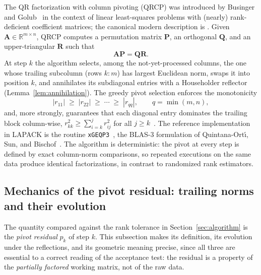 \documentclass[11pt,a4paper]{article}
\theoremstyle{definition}
\newcommand{\R}{\mathbb{R}}
\begin{document}
The QR factorization with column pivoting (QRCP) was introduced by
Businger and Golub~\cite{busingergolub1965} in the context of linear
least-squares problems with (nearly) rank-deficient coefficient
matrices; the canonical modern description is
\cite[\S5.4.2]{golubvanloan2013}. Given $\bm A\in\R^{m\times n}$,
QRCP computes a permutation matrix $\bm P$, an orthogonal $\bm Q$, and
an upper-triangular $\bm R$ such that
\begin{equation}
  \bm A\bm P=\bm Q\bm R.
  \label{eq:qrcp}
\end{equation}
At step $k$ the algorithm selects, among the not-yet-processed
columns, the one whose trailing subcolumn (rows $k{:}m$) has largest
Euclidean norm, swaps it into position $k$, and annihilates its
subdiagonal entries with a Householder reflector
(Lemma~\ref{lem:annihilation}). The greedy pivot selection enforces
the monotonicity
\begin{equation}
  |r_{11}|\;\ge\;|r_{22}|\;\ge\;\cdots\;\ge\;|r_{qq}|,
  \qquad q=\min(m,n),
  \label{eq:monotone}
\end{equation}
and, more strongly, guarantees that each diagonal entry dominates the
trailing block column-wise,
$r_{kk}^{2}\ge\sum_{i=k}^{j}r_{ij}^{2}$ for all $j\ge
k$~\cite[\S5.4.2]{golubvanloan2013}. The reference implementation in
LAPACK is the routine \texttt{xGEQP3}~\cite{lapack1999}, the BLAS-3
formulation of Quintana-Ort\'{\i}, Sun, and
Bischof~\cite{quintanaorti1998}. The algorithm is deterministic: the
pivot at every step is defined by exact column-norm comparisons, so
repeated executions on the same data produce identical factorizations,
in contrast to randomized rank estimators.

\subsection{Mechanics of the pivot residual: trailing norms and their
evolution}
\label{sec:pivotresidual}

The quantity compared against the rank tolerance in
Section~\ref{sec:algorithm} is the \emph{pivot residual}
$p_k$ of step $k$. This subsection makes its definition, its
evolution under the reflections, and its geometric meaning precise,
since all three are essential to a correct reading of the acceptance
test: the residual is a property of the \emph{partially factored}
working matrix, not of the raw data.
\end{document}
